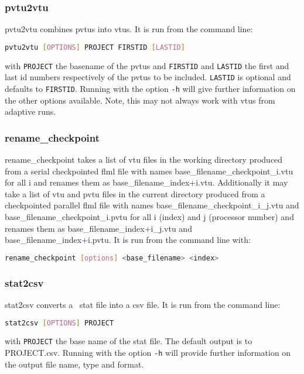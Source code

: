 \subsubsection{pvtu2vtu}
\label{sect:pvtu2vtu}
pvtu2vtu combines pvtus into vtus. It is run from the command line:
\begin{lstlisting}[language = Bash]
pvtu2vtu [OPTIONS] PROJECT FIRSTID [LASTID]
\end{lstlisting} 
with \lstinline[language = Bash]+PROJECT+ the basename of the pvtus and \lstinline[language = Bash]+FIRSTID+ and \lstinline[language = Bash]+LASTID+ the first and last id numbers respectively of the pvtus to be included. \lstinline[language = Bash]+LASTID+ is optional and defaults to \lstinline[language = Bash]+FIRSTID+. Running with the option \lstinline[language = Bash]+-h+ will give further information on the other options available. Note, this may not always work with vtus from adaptive runs.


\subsubsection{rename\_checkpoint}
\label{sect:rename_checkpoint}
rename\_checkpoint takes a list of vtu files in the working directory produced from a serial checkpointed flml file with names base\_filename\_checkpoint\_i.vtu for all i and renames them as base\_filename\_index+i.vtu. Additionally it may take a list of
vtu and pvtu files in the current directory produced from a checkpointed parallel flml file with names base\_filename\_checkpoint\_i\_j.vtu and base\_filename\_checkpoint\_i.pvtu for all i (index) and j (processor number) and renames them as base\_filename\_index+i\_j.vtu and base\_filename\_index+i.pvtu. It is run from the command line with:
\begin{lstlisting}[language = Bash]
rename_checkpoint [options] <base_filename> <index>
\end{lstlisting}



\subsubsection{stat2csv}
\label{sect:stat2csv}
stat2csv converts a \fluidity\ stat file into a csv file. It is run from the command line:
\begin{lstlisting}[language = Bash]
stat2csv [OPTIONS] PROJECT
\end{lstlisting} 
with \lstinline[language = Bash]+PROJECT+ the base name of the stat file. The default output is to PROJECT.csv. Running with the option \lstinline[language = Bash]+-h+ will provide further information on the output file name, type and format.

